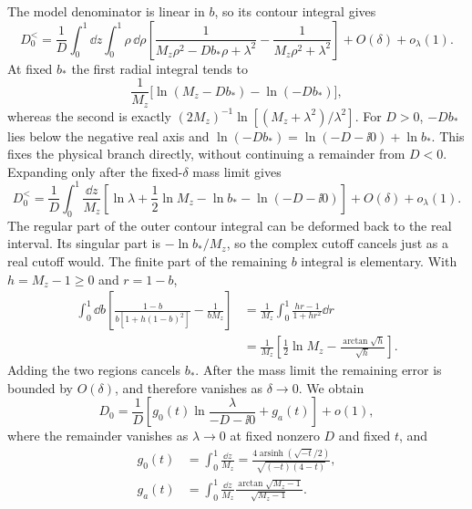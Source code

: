 The model denominator is linear in $b$, so its contour integral gives
\begin{equation}
 D_0^{<}=\frac1D\int_0^1\dd z\int_0^1\rho\,\dd\rho
 \left[\frac1{M_z\rho^2-Db_*\rho+\lambda^2}
       -\frac1{M_z\rho^2+\lambda^2}\right]
       +O(\delta)+o_\lambda(1).
\end{equation}
At fixed $b_*$ the first radial integral tends to
\begin{equation}
 \frac1{M_z}\bigl[\ln(M_z-Db_*)-\ln(-Db_*)\bigr],
\end{equation}
whereas the second is exactly
$(2M_z)^{-1}\ln[(M_z+\lambda^2)/\lambda^2]$.
For $D>0$, $-Db_*$ lies below the negative real axis and
$\ln(-Db_*)=\ln(-D-\ii0)+\ln b_*$.
This fixes the physical branch directly, without continuing a remainder
from $D<0$. Expanding only after the fixed-$\delta$ mass limit gives
\begin{equation}
 D_0^{<}=\frac1D\int_0^1\frac{\dd z}{M_z}
 \left[\ln\lambda+\frac12\ln M_z-\ln b_*
                       -\ln(-D-\ii0)\right]
       +O(\delta)+o_\lambda(1).
\end{equation}
The regular part of the outer contour integral can be deformed back
to the real interval. Its singular part is $-\ln b_*/M_z$,
so the complex cutoff cancels just as a real cutoff would.
The finite part of the remaining $b$ integral is elementary.
With $h=M_z-1\geq0$ and $r=1-b$,
\begin{align}
 \int_0^1\dd b\left[\frac{1-b}{b[1+h(1-b)^2]}
                       -\frac1{bM_z}\right]
 &=\frac1{M_z}\int_0^1\frac{hr-1}{1+hr^2}\dd r\\
 &=\frac1{M_z}\left[\frac12\ln M_z
                  -\frac{\arctan\sqrt h}{\sqrt h}\right].
\end{align}
Adding the two regions cancels $b_*$. After the mass limit the
remaining error is bounded by $O(\delta)$, and therefore vanishes
as $\delta\to0$. We obtain
\begin{equation}
 \boxed{D_0=\frac1D\left[g_0(t)\ln\frac\lambda{-D-\ii0}
                              +g_a(t)\right]+o(1),}
 \label{eq:comp-supp-box-integrated}
\end{equation}
where the remainder vanishes as $\lambda\to0$ at fixed nonzero
$D$ and fixed $t$, and
\begin{align}
 g_0(t)&=\int_0^1\frac{\dd z}{M_z}
 =\frac{4\operatorname{arsinh}(\sqrt{-t}/2)}{\sqrt{(-t)(4-t)}},\\
 g_a(t)&=\int_0^1\frac{\dd z}{M_z}
             \frac{\arctan\sqrt{M_z-1}}{\sqrt{M_z-1}}.
 \label{eq:comp-supp-box-one-dimensional}
\end{align}
